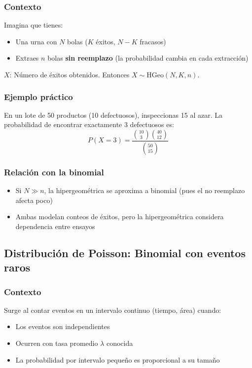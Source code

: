 \documentclass[letterpaper, 12pt]{article}
\begin{document}
	\subsubsection{Contexto}
	Imagina que tienes:
	\begin{itemize}
		\item Una urna con $N$ bolas ($K$ éxitos, $N-K$ fracasos)
		\item Extraes $n$ bolas \textbf{sin reemplazo} (la probabilidad cambia en cada extracción)
	\end{itemize}
	
	$X$: Número de éxitos obtenidos. Entonces $X \sim \text{HGeo}(N,K,n)$.
	
	\subsubsection{Ejemplo práctico}
	En un lote de 50 productos (10 defectuosos), inspeccionas 15 al azar. La probabilidad de encontrar exactamente 3 defectuosos es:
	\[
	P(X=3) = \frac{\binom{10}{3}\binom{40}{12}}{\binom{50}{15}}
	\]
	
	\subsubsection{Relación con la binomial}
	\begin{itemize}
		\item Si $N \gg n$, la hipergeométrica se aproxima a binomial (pues el no reemplazo afecta poco)
		\item Ambas modelan conteos de éxitos, pero la hipergeométrica considera dependencia entre ensayos
	\end{itemize}
	
	\subsection{Distribución de Poisson: Binomial con eventos raros}
	
	\subsubsection{Contexto}
	Surge al contar eventos en un intervalo continuo (tiempo, área) cuando:
	\begin{itemize}
		\item Los eventos son independientes
		\item Ocurren con tasa promedio $\lambda$ conocida
		\item La probabilidad por intervalo pequeño es proporcional a su tamaño
	\end{itemize}
	
\end{document}
